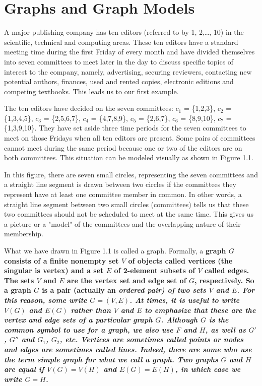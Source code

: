 \section{Graphs and Graph Models}
A major publishing company has ten editors (referred to by 1, 2,\ldots, 10) in the scientific, technical and computing areas. These ten editors have a standard meeting time during the first Friday of every month and have divided themselves into seven committees to meet later in the day to discuss specific topics of interest to the company, namely, advertising, securing reviewers, contacting new potential authors, finances, used and rented copies, electronic editions and competing textbooks. This leads us to our first example.

\begin{exmp}
The ten editors have decided on the seven committees: $c_{1}$ = \{1,2,3\}, $c_{2}$ = \{1,3,4,5\}, $c_{3}$ = \{2,5,6,7\}, $c_{4}$ = \{4,7,8,9\}, $c_{5}$ = \{2,6,7\}, $c_{6}$ = \{8,9,10\}, $c_{7}$ = \{1,3,9,10\}. They have set aside three time periods for the seven committees to meet on those Fridays when all ten editors are present. Some pairs of committees cannot meet during the same period because one or two of the editors are on both committees. This situation can be modeled visually as shown in Figure 1.1.



In this figure, there are seven small circles, representing the seven committees and a straight line segment is drawn between two circles if the committees they represent have at least one committee member in common. In other words, a straight line segment between two small circles (committees) tells us that these two committees should not be scheduled to meet at the same time. This gives us a picture or a "model" of the committees and the overlapping nature of their membership.
\end{exmp}

What we have drawn in Figure 1.1 is called a graph. Formally, a \bf{graph} $G$ consists of a finite nonempty set $V$ of objects called \bf{vertices} (the singular is \bf{vertex}) and a set $E$ of 2-element subsets of $V$ called \bf{edges}. The sets $V$ and $E$ are the \bf{vertex set} and \bf{edge set} of $G$, respectively. So a graph $G$ is a pair (actually an \it{ordered} pair) of two sets $V$ and $E$. For this reason, some write $G = (V,E)$. At times, it is useful to write $V(G)$ and $E(G)$ rather than $V$ and $E$ to emphasize that these are the vertex and edge sets of a particular graph $G$. Although $G$ is the common symbol to use for a graph, we also use $F$ and $H$, as well as $G'$, $G''$ and $G_{1}$, $G_{2}$, etc. Vertices are sometimes called \bf{points} or \bf{nodes} and edges are sometimes called \bf{lines}. Indeed, there are some who use the term \bf{simple graph} for what we call a graph. Two graphs $G$ and $H$ are \bf{equal} if $V(G) = V(H)$ and $E(G) = E(H)$, in which case we write $G = H$.

